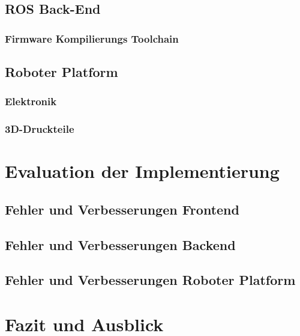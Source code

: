 \documentclass[11pt,twoside,a4paper,titlepage]{article}
\begin{document}
\subsection{ROS Back-End}
\subsubsection{Firmware Kompilierungs Toolchain}



\subsection{Roboter Platform}
\subsubsection{Elektronik}


\subsubsection{3D-Druckteile}


\section{Evaluation der Implementierung}

\subsection{Fehler und Verbesserungen Frontend}

\subsection{Fehler und Verbesserungen Backend}

\subsection{Fehler und Verbesserungen Roboter Platform}


\section{Fazit und Ausblick}
\end{document}

